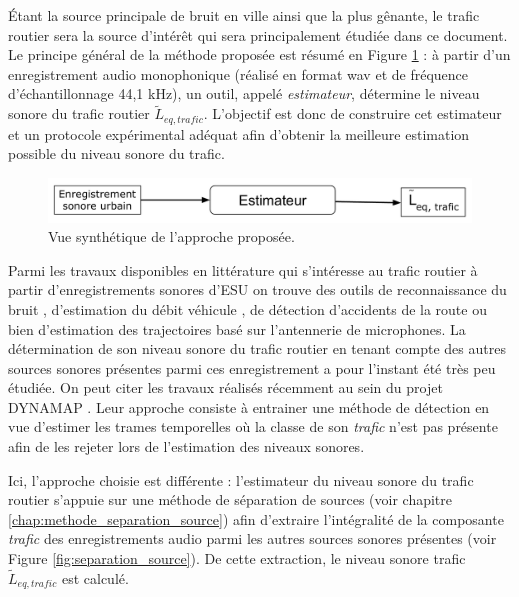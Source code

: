 Étant la source principale de bruit en ville ainsi que la plus gênante, le trafic routier sera la source d'intérêt qui sera principalement étudiée dans ce document. Le principe général de la méthode proposée est résumé en Figure \ref{fig:estimateur0} : à partir d'un enregistrement audio monophonique (réalisé en format wav et de fréquence d'échantillonnage 44,1 kHz), un outil, appelé \textit{estimateur}, détermine le niveau sonore du trafic routier $\tilde{L}_{eq,trafic}$.
L'objectif est donc de construire cet estimateur et un protocole expérimental adéquat afin d'obtenir la meilleure estimation possible du niveau sonore du trafic.\\

\begin{figure}[ht]
\centering
\includegraphics[width=0.7\linewidth]{./figures/NMF/bloc_diagram_estimateur0.pdf}
\caption{Vue synthétique de l'approche proposée.}
\label{fig:estimateur0}
\end{figure}


Parmi les travaux disponibles en littérature qui s'intéresse au trafic routier à partir d'enregistrements sonores d'ESU on trouve des outils de reconnaissance du bruit \cite{defreville_automatic_2006}, d'estimation du débit véhicule \cite{torija2012using}, de détection d'accidents de la route \cite{harlow2001automated} ou bien d'estimation des trajectoires \cite{leiba2017large} basé sur l'antennerie de microphones.
La détermination de son niveau sonore du trafic routier en tenant compte des autres sources sonores présentes parmi ces enregistrement a pour l'instant été très peu étudiée. On peut citer les travaux réalisés récemment au sein du projet DYNAMAP \cite{socoro2017anomalous}. Leur approche consiste à entrainer une méthode de détection en vue d'estimer les trames temporelles où la classe de son \textit{trafic} n'est pas présente afin de les rejeter lors de l'estimation des niveaux sonores. 

Ici, l'approche choisie est différente : l'estimateur du niveau sonore du trafic routier s'appuie sur une méthode de séparation de sources (voir chapitre \ref{chap:methode_separation_source}) afin d'extraire l'intégralité de la composante \textit{trafic} des enregistrements audio parmi les autres sources sonores présentes (voir Figure \ref{fig:separation_source}). De cette extraction, le niveau sonore trafic $\tilde{L}_{eq,trafic}$ est calculé.

